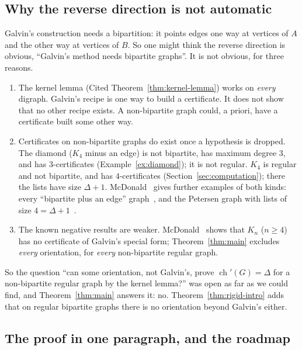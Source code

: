 \documentclass[11pt]{article}
\theoremstyle{plain}
\theoremstyle{definition}
\theoremstyle{remark}
\newcommand{\chil}{\operatorname{ch}'}
\begin{document}
\subsection{Why the reverse direction is not automatic}\label{sec:not-automatic}

Galvin's construction needs a bipartition: it points edges one way at vertices of $A$ and the
other way at vertices of $B$. So one might think the reverse direction is obvious, ``Galvin's
method needs bipartite graphs''. It is not obvious, for three reasons.

\begin{enumerate}[label=(\roman*)]
  \item The kernel lemma (Cited Theorem~\ref{thm:kernel-lemma}) works on \emph{every} digraph.
    Galvin's recipe is one way to build a certificate. It does not show that no other recipe
    exists. A non-bipartite graph could, a priori, have a certificate built some other way.
  \item Certificates on non-bipartite graphs do exist once a hypothesis is dropped. The diamond
    ($K_4$ minus an edge) is not bipartite, has maximum degree $3$, and has $3$-certificates
    (Example~\ref{ex:diamond}); it is not regular. $K_4$ is regular and not bipartite, and has
    $4$-certificates (Section~\ref{sec:computation}); there the lists have size $\Delta+1$.
    McDonald~\cite{mcd} gives further examples of both kinds: every ``bipartite plus an edge''
    graph~\cite[Theorem~3]{mcd}, and the Petersen graph with lists of size
    $4=\Delta+1$~\cite[Theorem~4]{mcd}.
  \item The known negative results are weaker. McDonald~\cite[Theorem~5]{mcd} shows that $K_n$
    ($n\ge 4$) has no certificate of Galvin's special form; Theorem~\ref{thm:main} excludes \emph{every}
    orientation, for \emph{every} non-bipartite regular graph.
\end{enumerate}

So the question ``can some orientation, not Galvin's, prove $\chil(G)=\Delta$ for a
non-bipartite regular graph by the kernel lemma?'' was open as far as we could find, and
Theorem~\ref{thm:main} answers it: no. Theorem~\ref{thm:rigid-intro} adds that on regular
bipartite graphs there is no orientation beyond Galvin's either.

\subsection{The proof in one paragraph, and the roadmap}\label{sec:roadmap}
\end{document}
